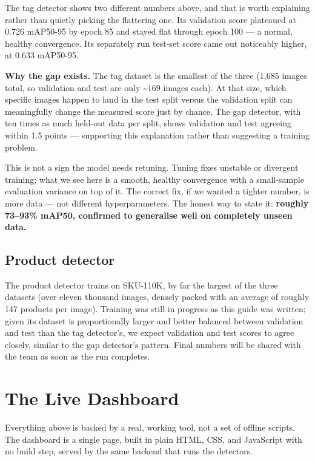 \documentclass[11pt,a4paper]{article}
\begin{document}
The tag detector shows two different numbers above, and that is worth explaining rather than
quietly picking the flattering one. Its validation score plateaued at 0.726 mAP50-95 by epoch 85
and stayed flat through epoch 100 --- a normal, healthy convergence. Its separately run test-set
score came out noticeably higher, at 0.633 mAP50-95.

\begin{notebox}
\textbf{Why the gap exists.} The tag dataset is the smallest of the three (1{,}685 images total,
so validation and test are only \textasciitilde 169 images each). At that size, which specific
images happen to land in the test split versus the validation split can meaningfully change the
measured score just by chance. The gap detector, with ten times as much held-out data per split,
shows validation and test agreeing within 1.5 points --- supporting this explanation rather than
suggesting a training problem.

This is not a sign the model needs retuning. Tuning fixes unstable or divergent training; what we
see here is a smooth, healthy convergence with a small-sample evaluation variance on top of it.
The correct fix, if we wanted a tighter number, is more data --- not different hyperparameters.
The honest way to state it: \textbf{roughly 73--93\% mAP50, confirmed to generalise well on
completely unseen data.}
\end{notebox}

\subsection{Product detector}
The product detector trains on SKU-110K, by far the largest of the three datasets (over eleven
thousand images, densely packed with an average of roughly 147 products per image). Training
was still in progress as this guide was written; given its dataset is proportionally larger and
better balanced between validation and test than the tag detector's, we expect validation and
test scores to agree closely, similar to the gap detector's pattern. Final numbers will be
shared with the team as soon as the run completes.

\section{The Live Dashboard}

Everything above is backed by a real, working tool, not a set of offline scripts. The dashboard
is a single page, built in plain HTML, CSS, and JavaScript with no build step, served by the
same backend that runs the detectors.
\end{document}
